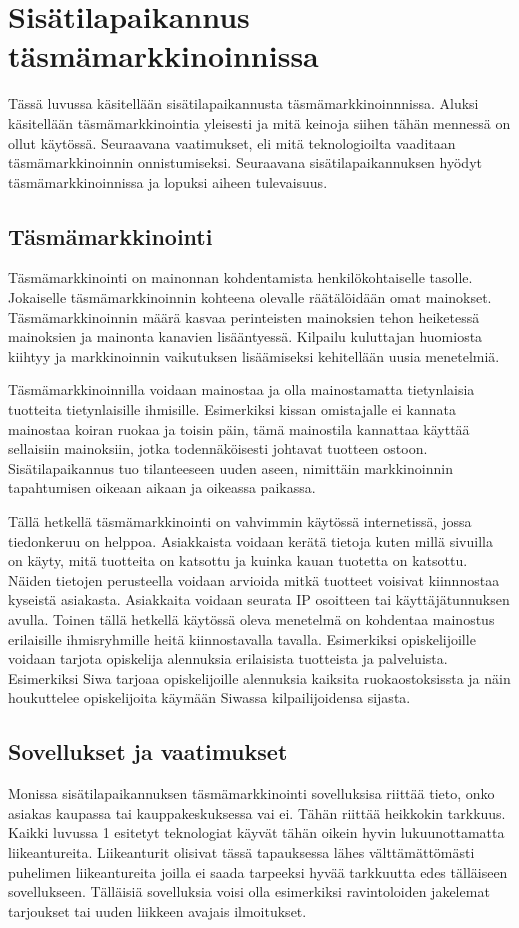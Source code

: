 \section{Sisätilapaikannus täsmämarkkinoinnissa}
Tässä luvussa käsitellään sisätilapaikannusta täsmämarkkinoinnnissa. Aluksi käsitellään täsmämarkkinointia yleisesti ja mitä keinoja siihen tähän mennessä on ollut käytössä. Seuraavana vaatimukset, eli mitä teknologioilta vaaditaan täsmämarkkinoinnin onnistumiseksi. Seuraavana sisätilapaikannuksen hyödyt täsmämarkkinoinnissa ja lopuksi aiheen tulevaisuus.
\subsection{Täsmämarkkinointi}
Täsmämarkkinointi on mainonnan kohdentamista henkilökohtaiselle tasolle. Jokaiselle täsmämarkkinoinnin kohteena olevalle räätälöidään omat mainokset. Täsmämarkkinoinnin määrä kasvaa perinteisten mainoksien tehon heiketessä mainoksien ja mainonta kanavien lisääntyessä\cite{tasma}. Kilpailu kuluttajan huomiosta kiihtyy ja markkinoinnin vaikutuksen lisäämiseksi kehitellään uusia menetelmiä.

Täsmämarkkinoinnilla voidaan mainostaa ja olla mainostamatta tietynlaisia tuotteita tietynlaisille ihmisille. Esimerkiksi kissan omistajalle ei kannata mainostaa koiran ruokaa ja toisin päin\cite{tasma}, tämä mainostila kannattaa käyttää sellaisiin mainoksiin, jotka todennäköisesti johtavat tuotteen ostoon. Sisätilapaikannus tuo tilanteeseen uuden aseen, nimittäin markkinoinnin tapahtumisen oikeaan aikaan ja oikeassa paikassa.

Tällä hetkellä täsmämarkkinointi on vahvimmin käytössä internetissä, jossa tiedonkeruu on helppoa. Asiakkaista voidaan kerätä tietoja kuten millä sivuilla on käyty, mitä tuotteita on katsottu ja kuinka kauan tuotetta on katsottu. Näiden tietojen perusteella voidaan arvioida mitkä tuotteet voisivat kiinnnostaa kyseistä asiakasta. Asiakkaita voidaan seurata IP osoitteen tai käyttäjätunnuksen avulla.
Toinen tällä hetkellä käytössä oleva menetelmä on kohdentaa mainostus erilaisille ihmisryhmille heitä kiinnostavalla tavalla. Esimerkiksi opiskelijoille voidaan tarjota opiskelija alennuksia erilaisista tuotteista ja palveluista. Esimerkiksi Siwa tarjoaa opiskelijoille alennuksia kaiksita ruokaostoksissta\cite{siwa} ja näin houkuttelee opiskelijoita käymään Siwassa kilpailijoidensa sijasta. 

\subsection{Sovellukset ja vaatimukset}
Monissa sisätilapaikannuksen täsmämarkkinointi sovelluksisa riittää tieto, onko asiakas kaupassa tai kauppakeskuksessa vai ei. Tähän riittää heikkokin tarkkuus. Kaikki luvussa 1 esitetyt teknologiat käyvät tähän oikein hyvin lukuunottamatta liikeantureita. Liikeanturit olisivat tässä tapauksessa lähes välttämättömästi puhelimen liikeantureita joilla ei saada tarpeeksi hyvää tarkkuutta edes tälläiseen sovellukseen. Tälläisiä sovelluksia voisi olla esimerkiksi ravintoloiden jakelemat tarjoukset tai uuden liikkeen avajais ilmoitukset.

